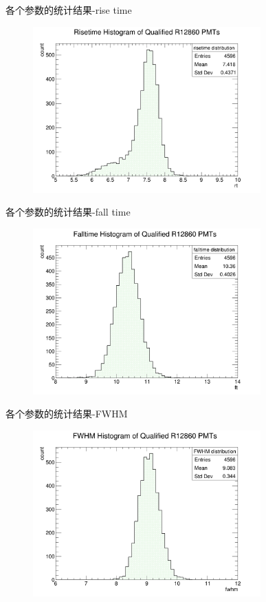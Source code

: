 \begin{frame}{各个参数的统计结果-rise time}
\begin{figure}
\centering
\includegraphics[width=0.78\textwidth]{figures/rt.png}
\end{figure}
\end{frame}
\begin{frame}{各个参数的统计结果-fall time}
\begin{figure}
\centering
\includegraphics[width=0.78\textwidth]{figures/ft.png}
\end{figure}
\end{frame}
\begin{frame}{各个参数的统计结果-FWHM}
\begin{figure}
\centering
\includegraphics[width=0.78\textwidth]{figures/fwhm.png}
\end{figure}
\end{frame}
